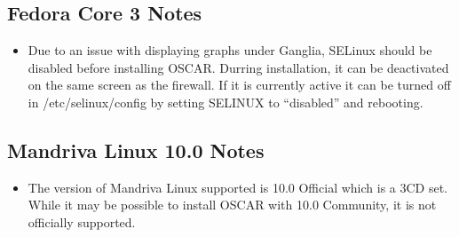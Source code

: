 
\subsection{Fedora Core 3 Notes}
\label{subsec:fc3notes}

\begin{itemize}

\item Due to an issue with displaying graphs under Ganglia, SELinux should
  be disabled before installing OSCAR.  Durring installation, it can be
  deactivated on the same screen as the firewall.  If it is currently
  active it can be turned off in /etc/selinux/config by setting SELINUX 
  to ``disabled'' and rebooting.

\end{itemize}


\subsection{Mandriva Linux 10.0 Notes}
\label{subsec:mdk10notes}

\begin{itemize}

\item The version of Mandriva Linux supported is 10.0 Official which is a
3CD set.  While it may be possible to install OSCAR with 10.0 Community,
it is not officially supported.

\end{itemize}
